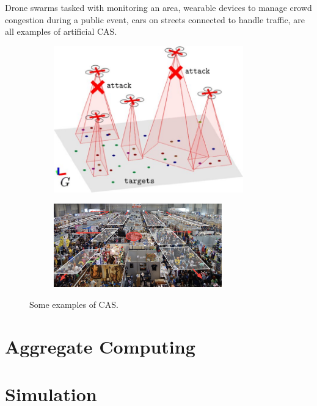 \documentclass[12pt,a4paper,openright,twoside]{book}
\begin{document}
Drone swarms tasked with monitoring an area, wearable devices to manage crowd congestion during a public event, cars on streets connected to handle traffic, are all examples of artificial CAS. \cite{2}

\begin{figure}[t]
  \centering
  \begin{subfigure}[b]{0.49\textwidth}
      \centering
      \includegraphics[width=0.9\textwidth]{figures/swarm2.jpeg}
  \end{subfigure}

  \begin{subfigure}[b]{0.49\textwidth}
      \centering
      \includegraphics[width=0.8\textwidth]{figures/crowd.png}
  \end{subfigure}
  \caption{Some examples of CAS.}
\end{figure}

\section{Aggregate Computing}

\section{Simulation}
\end{document}
